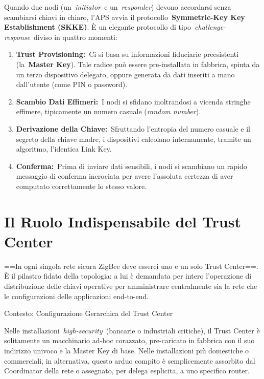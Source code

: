 \documentclass[
  italian,
  openany]{book}
\begin{document}
Quando due nodi (un~\emph{initiator}~e un~\emph{responder}) devono
accordarsi senza scambiarsi chiavi in chiaro, l'APS avvia il
protocollo~\textbf{Symmetric-Key Key Establishment (SKKE)}. È un
elegante protocollo di tipo~\emph{challenge-response}~diviso in quattro
momenti:

\begin{enumerate}
\def\labelenumi{\arabic{enumi}.}
\item
  \textbf{Trust Provisioning:}~Ci si basa su informazioni fiduciarie
  preesistenti (la~\textbf{Master Key}). Tale radice può essere
  pre-installata in fabbrica, spinta da un terzo dispositivo delegato,
  oppure generata da dati inseriti a mano dall'utente (come PIN o
  password).
\item
  \textbf{Scambio Dati Effimeri:}~I nodi si sfidano inoltrandosi a
  vicenda stringhe effimere, tipicamente un numero casuale (\emph{random
  number}).
\item
  \textbf{Derivazione della Chiave:}~Sfruttando l'entropia del numero
  casuale e il segreto della chiave madre, i dispositivi calcolano
  internamente, tramite un algoritmo, l'identica Link Key.
\item
  \textbf{Conferma:}~Prima di inviare dati sensibili, i nodi si
  scambiano un rapido messaggio di conferma incrociata per avere
  l'assoluta certezza di aver computato correttamente lo stesso valore.
\end{enumerate}

\section{Il Ruolo Indispensabile del Trust
Center}\label{il-ruolo-indispensabile-del-trust-center}

==In ogni singola rete sicura ZigBee deve esserci uno e un solo Trust
Center==. È il pilastro fidato della topologia: a lui è demandata per
intero l'operazione di distribuzione delle chiavi operative per
amministrare centralmente sia la rete che le configurazioni delle
applicazioni end-to-end.

\begin{calloutnote}{Contesto: Configurazione Gerarchica del Trust Center}

Nelle installazioni~\emph{high-security}~(bancarie o industriali
critiche), il Trust Center è solitamente un macchinario ad-hoc
corazzato, pre-caricato in fabbrica con il suo indirizzo univoco e la
Master Key di base. Nelle installazioni più domestiche o commerciali, in
alternativa, questo arduo compito è semplicemente assorbito dal
Coordinator della rete o assegnato, per delega esplicita, a uno
specifico router.

\end{calloutnote}
\end{document}
